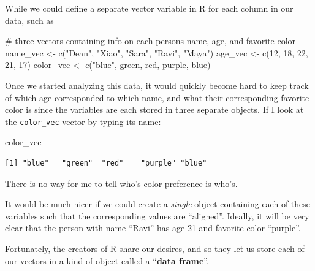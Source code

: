 \documentclass[
  letterpaper,
  DIV=11,
  numbers=noendperiod]{scrreprt}
\newenvironment{Shaded}{\begin{snugshade}}{\end{snugshade}}
\newcommand{\CommentTok}[1]{\textcolor[rgb]{0.37,0.37,0.37}{#1}}
\newcommand{\DecValTok}[1]{\textcolor[rgb]{0.68,0.00,0.00}{#1}}
\newcommand{\FunctionTok}[1]{\textcolor[rgb]{0.28,0.35,0.67}{#1}}
\newcommand{\NormalTok}[1]{\textcolor[rgb]{0.00,0.23,0.31}{#1}}
\newcommand{\OtherTok}[1]{\textcolor[rgb]{0.00,0.23,0.31}{#1}}
\newcommand{\StringTok}[1]{\textcolor[rgb]{0.13,0.47,0.30}{#1}}
\begin{document}
While we could define a separate vector variable in R for each column in
our data, such as

\begin{Shaded}
\begin{Highlighting}[]
\CommentTok{\# three vectors containing info on each person\textquotesingle{}s name, age, and favorite color}
\NormalTok{name\_vec }\OtherTok{\textless{}{-}} \FunctionTok{c}\NormalTok{(}\StringTok{"Dean"}\NormalTok{, }\StringTok{"Xiao"}\NormalTok{, }\StringTok{"Sara"}\NormalTok{, }\StringTok{"Ravi"}\NormalTok{, }\StringTok{"Maya"}\NormalTok{)}
\NormalTok{age\_vec }\OtherTok{\textless{}{-}} \FunctionTok{c}\NormalTok{(}\DecValTok{12}\NormalTok{, }\DecValTok{18}\NormalTok{, }\DecValTok{22}\NormalTok{, }\DecValTok{21}\NormalTok{, }\DecValTok{17}\NormalTok{)}
\NormalTok{color\_vec }\OtherTok{\textless{}{-}} \FunctionTok{c}\NormalTok{(}\StringTok{"blue"}\NormalTok{, }\StringTok{\textquotesingle{}green\textquotesingle{}}\NormalTok{, }\StringTok{\textquotesingle{}red\textquotesingle{}}\NormalTok{, }\StringTok{\textquotesingle{}purple\textquotesingle{}}\NormalTok{, }\StringTok{\textquotesingle{}blue\textquotesingle{}}\NormalTok{)}
\end{Highlighting}
\end{Shaded}

Once we started analyzing this data, it would quickly become hard to
keep track of which age corresponded to which name, and what their
corresponding favorite color is since the variables are each stored in
three separate objects. If I look at the \texttt{color\_vec} vector by
typing its name:

\begin{Shaded}
\begin{Highlighting}[]
\NormalTok{color\_vec}
\end{Highlighting}
\end{Shaded}

\begin{verbatim}
[1] "blue"   "green"  "red"    "purple" "blue"  
\end{verbatim}

There is no way for me to tell who's color preference is who's.

It would be much nicer if we could create a \emph{single} object
containing each of these variables such that the corresponding values
are ``aligned''. Ideally, it will be very clear that the person with
name ``Ravi'' has age 21 and favorite color ``purple''.

Fortunately, the creators of R share our desires, and so they let us
store each of our vectors in a kind of object called a ``\textbf{data
frame}''.
\end{document}
